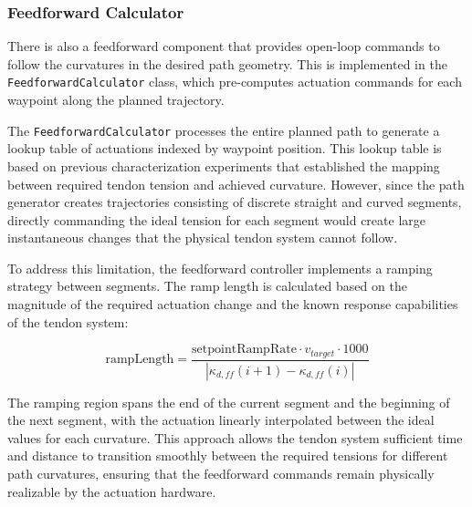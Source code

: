 \subsubsection{Feedforward Calculator}
There is also a feedforward component that provides open-loop commands to follow the curvatures in the desired path geometry. This is implemented in the \texttt{FeedforwardCalculator} class, which pre-computes actuation commands for each waypoint along the planned trajectory. 

The \texttt{FeedforwardCalculator} processes the entire planned path to generate a lookup table of actuations indexed by waypoint position. This lookup table is based on previous characterization experiments that established the mapping between required tendon tension and achieved curvature. However, since the path generator creates trajectories consisting of discrete straight and curved segments, directly commanding the ideal tension for each segment would create large instantaneous changes that the physical tendon system cannot follow.

To address this limitation, the feedforward controller implements a ramping strategy between segments. The ramp length is calculated based on the magnitude of the required actuation change and the known response capabilities of the tendon system:

\begin{equation}
\text{rampLength} = \frac{\text{setpointRampRate} \cdot v_{target} \cdot 1000}{|\kappa_{d,ff}(i+1) - \kappa_{d,ff}(i)|}
\end{equation}

The ramping region spans the end of the current segment and the beginning of the next segment, with the actuation linearly interpolated between the ideal values for each curvature. This approach allows the tendon system sufficient time and distance to transition smoothly between the required tensions for different path curvatures, ensuring that the feedforward commands remain physically realizable by the actuation hardware.



